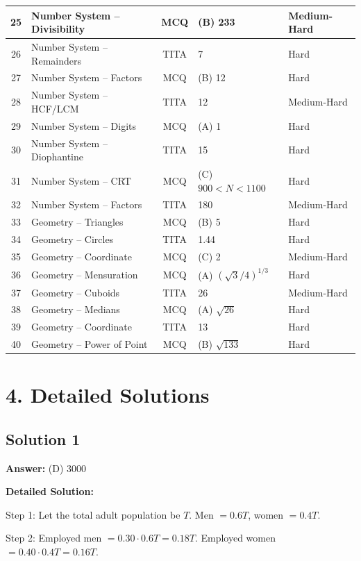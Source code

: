 \documentclass[11pt]{article}
\begin{document}
\begin{longtable}{|c|l|c|l|l|}
25 & Number System -- Divisibility & MCQ & (B) 233 & Medium-Hard \\ \hline
26 & Number System -- Remainders & TITA & 7 & Hard \\ \hline
27 & Number System -- Factors & MCQ & (B) 12 & Hard \\ \hline
28 & Number System -- HCF/LCM & TITA & 12 & Medium-Hard \\ \hline
29 & Number System -- Digits & MCQ & (A) 1 & Hard \\ \hline
30 & Number System -- Diophantine & TITA & 15 & Hard \\ \hline
31 & Number System -- CRT & MCQ & (C) $900 < N < 1100$ & Hard \\ \hline
32 & Number System -- Factors & TITA & 180 & Medium-Hard \\ \hline
33 & Geometry -- Triangles & MCQ & (B) 5 & Hard \\ \hline
34 & Geometry -- Circles & TITA & 1.44 & Hard \\ \hline
35 & Geometry -- Coordinate & MCQ & (C) 2 & Medium-Hard \\ \hline
36 & Geometry -- Mensuration & MCQ & (A) $(\sqrt{3}/4)^{1/3}$ & Hard \\ \hline
37 & Geometry -- Cuboids & TITA & 26 & Medium-Hard \\ \hline
38 & Geometry -- Medians & MCQ & (A) $\sqrt{26}$ & Hard \\ \hline
39 & Geometry -- Coordinate & TITA & 13 & Hard \\ \hline
40 & Geometry -- Power of Point & MCQ & (B) $\sqrt{133}$ & Hard \\ \hline
\end{longtable}

\newpage
\section*{4. Detailed Solutions}

\subsection*{Solution 1}
\textbf{Answer:} (D) 3000

\textbf{Detailed Solution:}

Step 1: Let the total adult population be $T$. Men $= 0.6T$, women $= 0.4T$.

Step 2: Employed men $= 0.30 \cdot 0.6T = 0.18T$. Employed women $= 0.40 \cdot 0.4T = 0.16T$.
\end{document}
